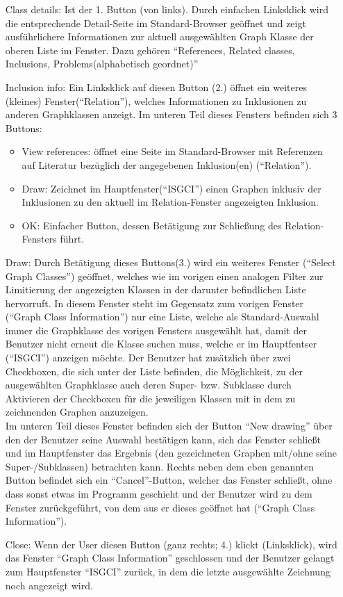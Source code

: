 \documentclass[10pt,a4paper]{article}
\begin{document}
\begin{itemize}
\item[Class details:] Ist der 1. Button (von links). Durch einfachen Linksklick wird die entsprechende Detail-Seite im Standard-Browser geöffnet und zeigt ausführlichere Informationen zur aktuell ausgewählten Graph Klasse der oberen Liste im Fenster. Dazu gehören "`References, Related classes, Inclusions, Problems(alphabetisch geordnet)"'
\item[Inclusion info:] Ein Linksklick auf diesen Button (2.) öffnet ein weiteres (kleines) Fenster("`Relation"'), welches Informationen zu Inklusionen zu anderen Graphklassen anzeigt. Im unteren Teil dieses Fensters befinden sich 3 Buttons:
\begin{itemize}
\item View references: öffnet eine Seite im Standard-Browser mit Referenzen auf Literatur bezüglich der angegebenen Inklusion(en) ("`Relation"').
\item Draw: Zeichnet im Hauptfenster("`ISGCI"') einen Graphen inklusiv der Inklusionen zu den aktuell im Relation-Fenster angezeigten Inklusion.
\item OK: Einfacher Button, dessen Betätigung zur Schließung des Relation-Fensters führt.
\end{itemize}
\item[Draw:] Durch Betätigung dieses Buttons(3.) wird ein weiteres Fenster ("`Select Graph Classes"') geöffnet, welches wie im vorigen einen analogen Filter zur Limitierung der angezeigten Klassen in der darunter befindlichen Liste hervorruft. In diesem Fenster steht im Gegensatz zum vorigen Fenster ("`Graph Class Information"') nur eine Liste, welche als Standard-Auswahl immer die Graphklasse des vorigen Fensters ausgewählt hat, damit der Benutzer nicht erneut die Klasse suchen muss, welche er im Hauptfentser ("`ISGCI"') anzeigen möchte. Der Benutzer hat zusätzlich über zwei Checkboxen, die sich unter der Liste befinden, die Möglichkeit, zu der ausgewählten Graphklasse auch deren Super- bzw. Subklasse durch Aktivieren der Checkboxen für die jeweiligen Klassen mit in dem zu zeichnenden Graphen anzuzeigen. \\ Im unteren Teil dieses Fenster befinden sich der Button "`New drawing"' über den der Benutzer seine Auswahl bestätigen kann, sich das Fenster schließt und im Hauptfenster das Ergebnis (den gezeichneten Graphen mit/ohne seine Super-/Subklassen) betrachten kann. Rechts neben dem eben genannten Button befindet sich ein "`Cancel"'-Button, welcher das Fenster schließt, ohne dass sonst etwas im Programm geschieht und der Benutzer wird zu dem Fenster zurückgeführt, von dem aus er dieses geöffnet hat ("`Graph Class Information"').
\item[Close:] Wenn der User diesen Button (ganz rechts; 4.) klickt (Linksklick), wird das Fenster "`Graph Class Information"' geschlossen und der Benutzer gelangt zum Hauptfenster "`ISGCI"' zurück, in dem die letzte ausgewählte Zeichnung noch angezeigt wird.
\end{itemize}
\end{document}
